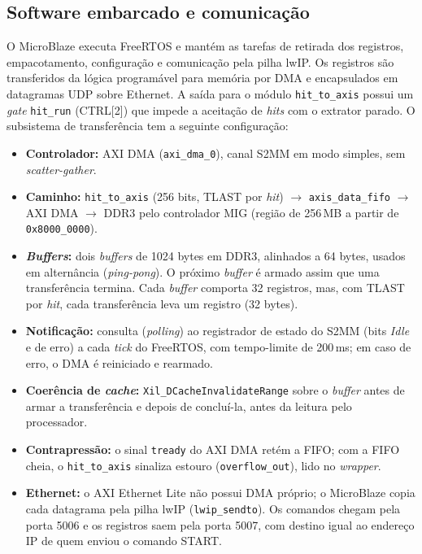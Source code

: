 \subsection{Software embarcado e comunicação}
\label{v2:subsec:software_comunicacao}

O MicroBlaze executa FreeRTOS e mantém as tarefas de retirada dos registros, empacotamento, configuração e comunicação pela pilha lwIP. Os registros são transferidos da lógica programável para memória por DMA e encapsulados em datagramas UDP sobre Ethernet. A saída para o módulo \texttt{hit\_to\_axis} possui um \textit{gate} \texttt{hit\_run} (CTRL[2]) que impede a aceitação de \textit{hits} com o extrator parado. O subsistema de transferência tem a seguinte configuração:

\begin{itemize}
	\item \textbf{Controlador:} AXI DMA (\texttt{axi\_dma\_0}), canal S2MM em modo simples, sem \textit{scatter-gather}.
	\item \textbf{Caminho:} \texttt{hit\_to\_axis} (256 bits, TLAST por \textit{hit}) \(\rightarrow\) \texttt{axis\_data\_fifo} \(\rightarrow\) AXI DMA \(\rightarrow\) DDR3 pelo controlador MIG (região de 256\,MB a partir de \texttt{0x8000\_0000}).
	\item \textbf{\textit{Buffers}:} dois \textit{buffers} de 1024 bytes em DDR3, alinhados a 64 bytes, usados em alternância (\textit{ping-pong}). O próximo \textit{buffer} é armado assim que uma transferência termina. Cada \textit{buffer} comporta 32 registros, mas, com TLAST por \textit{hit}, cada transferência leva um registro (32 bytes).
	\item \textbf{Notificação:} consulta (\textit{polling}) ao registrador de estado do S2MM (bits \textit{Idle} e de erro) a cada \textit{tick} do FreeRTOS, com tempo-limite de 200\,ms; em caso de erro, o DMA é reiniciado e rearmado.
	\item \textbf{Coerência de \textit{cache}:} \texttt{Xil\_DCacheInvalidateRange} sobre o \textit{buffer} antes de armar a transferência e depois de concluí-la, antes da leitura pelo processador.
	\item \textbf{Contrapressão:} o sinal \texttt{tready} do AXI DMA retém a FIFO; com a FIFO cheia, o \texttt{hit\_to\_axis} sinaliza estouro (\texttt{overflow\_out}), lido no \textit{wrapper}.
	\item \textbf{Ethernet:} o AXI Ethernet Lite não possui DMA próprio; o MicroBlaze copia cada datagrama pela pilha lwIP (\texttt{lwip\_sendto}). Os comandos chegam pela porta 5006 e os registros saem pela porta 5007, com destino igual ao endereço IP de quem enviou o comando START.
\end{itemize}

